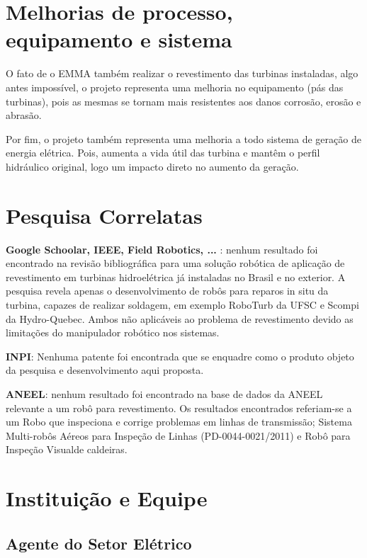 
\section{Melhorias de processo, equipamento e sistema}

O fato de o EMMA também realizar o revestimento das turbinas instaladas, algo
antes impossível, o projeto representa uma melhoria no equipamento (pás das
turbinas), pois as mesmas se tornam mais resistentes aos danos corrosão, erosão e abrasão.

Por fim, o projeto também representa uma melhoria a todo sistema de geração de
energia elétrica. Pois, aumenta a vida útil das turbina e mantêm o perfil
hidráulico original, logo um impacto direto no aumento da geração.

\section{Pesquisa Correlatas}

\textbf{Google Schoolar, IEEE, Field Robotics, ... }: nenhum resultado foi
encontrado na revisão bibliográfica para uma solução robótica de aplicação de
revestimento em turbinas hidroelétrica já instaladas no Brasil e no exterior. A
pesquisa revela apenas o desenvolvimento de robôs para reparos in situ da
turbina, capazes de realizar soldagem, em exemplo RoboTurb da UFSC e Scompi da
Hydro-Quebec. Ambos não aplicáveis ao problema de revestimento devido as
limitações do manipulador robótico nos sistemas.

\textbf{INPI}: Nenhuma patente foi encontrada que se enquadre como o produto
objeto da pesquisa e desenvolvimento aqui proposta.

\textbf{ANEEL}: nenhum resultado foi encontrado na base de dados da ANEEL
relevante a um robô para revestimento. Os resultados encontrados referiam-se a
um Robo que inspeciona e corrige problemas em linhas de transmissão; Sistema
Multi-robôs Aéreos para Inspeção de Linhas (PD-0044-0021/2011) e Robô para Inspeção Visualde
caldeiras.

\section{Instituição e Equipe}


\subsection{Agente do Setor Elétrico} 

